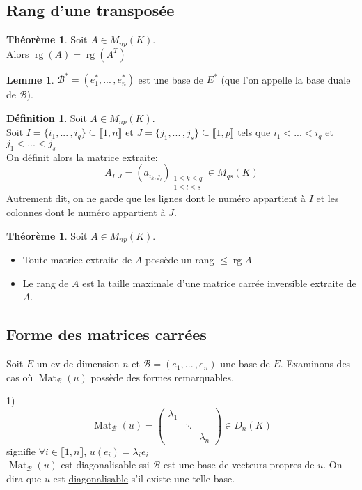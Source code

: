 \documentclass[10pt,a4paper]{article}
\theoremstyle{definition}
\newtheorem{theorem}[proposition]{Théorème}
\newtheorem{lemme}[proposition]{Lemme}
\newtheorem{definition}[proposition]{Définition}
\DeclareMathOperator{\rg}{rg}
\DeclareMathOperator{\Mat}{Mat}
\begin{document}
\subsection{Rang d'une transposée}
\begin{theorem}
Soit $A \in M_{np}(K)$. \\
Alors $\rg (A) = \rg (A^T)$
\end{theorem}
\begin{lemme}
$\mathcal{B}^* = (e_1^*, ...\, , e_n^*)$ est une base de $E^*$ (que l'on appelle la \uline{base duale} de $\mathcal{B}$).
\end{lemme}
\begin{definition}
Soit $A \in M_{np}(K)$. \\
Soit $I = \{i_1, ...\, , i_q\} \subseteq \llbracket 1, n \rrbracket$ et $J = \{ j_1, ...\, , j_s\} \subseteq \llbracket 1, p \rrbracket$ tels que $i_1 < ... < i_q$ et $j_1 < ... < j_s$ \\
On définit alors la \uline{matrice extraite}:
\[A_{I,J} = (a_{i_k, j_l})_{\substack{1 \leq k \leq q \\ 1 \leq l \leq s}} \in M_{qs}(K)\]
Autrement dit, on ne garde que les lignes dont le numéro appartient à $I$ et les colonnes dont le numéro appartient à $J$.
\end{definition}
\begin{theorem}
Soit $A \in M_{np}(K)$.
\begin{itemize}
\item Toute matrice extraite de $A$ possède un rang $\leq \rg A$
\item Le rang de $A$ est la taille maximale d'une matrice carrée inversible extraite de $A$.
\end{itemize}
\end{theorem}

\subsection{Forme des matrices carrées}
Soit $E$ un ev de dimension $n$ et $\mathcal{B} = (e_1, ...\, , e_n)$ une base de $E$. Examinons des cas où $\Mat_\mathcal{B}(u)$ possède des formes remarquables.

1) \[\Mat_\mathcal{B}(u) = \begin{pmatrix}
\lambda_1 & & \\
 & \ddots & \\
 & & \lambda_n
\end{pmatrix} \in D_n(K)\]
signifie $\forall i \in \llbracket 1, n \rrbracket$, $u(e_i) = \lambda_i e_i$ \\
$\Mat_\mathcal{B}(u)$ est diagonalisable ssi $\mathcal{B}$ est une base de vecteurs propres de $u$. On dira que $u$ est \uline{diagonalisable} s'il existe une telle base.
\end{document}

